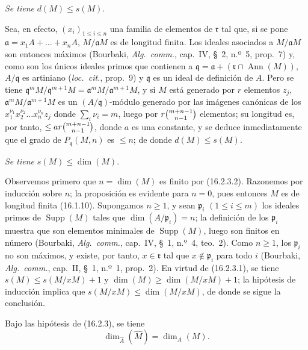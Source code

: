 \begin{env}[16.2.3.3]
\label{0.16.2.3.3-fr}
\emph{Se tiene} $d(M)\leq s(M)$.
\end{env}

Sea, en efecto, $(x_i)_{1\leq i\leq n}$ una familia de elementos de
$\mathfrak{r}$ tal que, si se pone
$\mathfrak{a}=x_1A+\ldots+x_nA$, $M/\mathfrak{a}M$ es de longitud finita.
Los ideales asociados a $M/\mathfrak{a}M$ son entonces máximos (Bourbaki,
\emph{Alg.~comm.}, cap.~IV, \S~2, n.º~5, prop.~7) y, como son los únicos
ideales primos que contienen a
$\mathfrak{q}=\mathfrak{a}+(\mathfrak{r}\cap\operatorname{Ann}(M))$,
$A/\mathfrak{q}$ es artiniano (\emph{loc.~cit.}, prop.~9) y $\mathfrak{q}$ es
un ideal de definición de $A$. Pero se tiene
$\mathfrak{q}^mM/\mathfrak{q}^{m+1}M=
\mathfrak{a}^mM/\mathfrak{a}^{m+1}M$, y si $M$ está generado por $r$ elementos
$z_j$, $\mathfrak{a}^mM/\mathfrak{a}^{m+1}M$ es un
$(A/\mathfrak{q})$-módulo generado por las imágenes canónicas de los
$x_1^{\nu_1}x_2^{\nu_2}\ldots x_n^{\nu_n}z_j$ donde
$\sum_i\nu_i=m$, luego por $r\binom{m+n- 1}{n- 1}$ elementos; su longitud es,
por tanto, $\leq ar\binom{m+n- 1}{n- 1}$, donde $a$ es una constante, y se
deduce inmediatamente que el grado de $P_{\mathfrak{q}}(M,n)$ es $\leq n$;
de donde $d(M)\leq s(M)$.

\begin{env}[16.2.3.4]
\label{0.16.2.3.4-fr}
\emph{Se tiene} $s(M)\leq\dim(M)$.
\end{env}

Observemos primero que $n=\dim(M)$ es finito por (16.2.3.2). Razonemos por
inducción sobre $n$; la proposición es evidente para $n=0$, pues entonces $M$
es de longitud finita (16.1.10). Supongamos $n\geq1$, y sean
$\mathfrak{p}_i$ $(1\leq i\leq m)$ los ideales primos de
$\operatorname{Supp}(M)$ tales que $\dim(A/\mathfrak{p}_i)=n$; la definición
de los $\mathfrak{p}_i$ muestra que son elementos minimales de
$\operatorname{Supp}(M)$, luego son finitos en número (Bourbaki,
\emph{Alg.~comm.}, cap.~IV, \S~1, n.º~4, teo.~2). Como $n\geq1$, los
$\mathfrak{p}_i$ no son máximos, y existe, por tanto,
$x\in\mathfrak{r}$ tal que $x\notin\mathfrak{p}_i$ para todo $i$ (Bourbaki,
\emph{Alg.~comm.}, cap.~II, \S~1, n.º~1, prop.~2). En virtud de (16.2.3.1),
se tiene $s(M)\leq s(M/xM)+1$ y $\dim(M)\geq\dim(M/xM)+1$; la hipótesis de
inducción implica que $s(M/xM)\leq\dim(M/xM)$, de donde se sigue la conclusión.

\begin{corollary}[16.2.4]
\label{0.16.2.4-fr}
Bajo las hipótesis de \textup{(16.2.3)}, se tiene
\begin{equation}
\label{0.16.2.4.1-fr}
\tag{16.2.4.1}
  \dim_{\widehat{A}}(\widehat{M})=\dim_A(M).
\end{equation}
\end{corollary}

